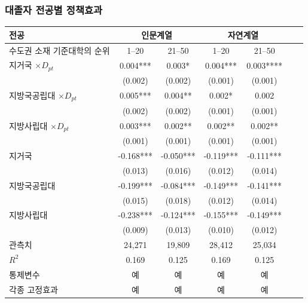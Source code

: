 \documentclass[aspectratio=169,xcolor=dvipsnames,handout]{beamer}
\begin{document}
\begin{frame}
    \frametitle{대졸자 전공별 정책효과}
    \begin{table}[ht]
        \tiny
        \centering
        \begin{tabular}{lcccccc}
        \toprule
        \textbf{전공} & \multicolumn{2}{c}{\textbf{인문계열}}& \multicolumn{2}{c}{\textbf{자연계열}} \\
        \midrule                                                                                  
        수도권 소재 기준대학의 순위    & 1--20     & 21--50    & 1--20     & 21--50    \\
        \midrule                                                          
        지거국 $\times D_{pt}$                         & 0.004***  & 0.003*    & 0.004***  & 0.003**** \\
                                                     & (0.002)   & (0.002)   & (0.001)   & (0.001)   \\
        지방국공립대 $\times D_{pt}$  & 0.005***  & 0.004**   & 0.002*    & 0.002     \\
                                                     & (0.002)   & (0.002)   & (0.001)   & (0.001)   \\
        지방사립대 $\times D_{pt}$ & 0.003***  & 0.002**   & 0.002**   & 0.002**   \\
                                                     & (0.001)   & (0.001)   & (0.001)   & (0.001)   \\
        지거국                                         & -0.168*** & -0.050*** & -0.119*** & -0.111*** \\
                                                     & (0.013)   & (0.016)   & (0.012)   & (0.014)   \\
        지방국공립대                  & -0.199*** & -0.084*** & -0.149*** & -0.141*** \\
                                                     & (0.015)   & (0.018)   & (0.012)   & (0.014)   \\
        지방사립대                 & -0.238*** & -0.124*** & -0.155*** & -0.149*** \\
                                                     & (0.009)   & (0.013)   & (0.010)   & (0.012)   \\
        \midrule                                                          
        관측치                                 & 24,271    & 19,809    & 28,412    & 25,034    \\
        $R^2$                                    & 0.169     & 0.125     & 0.169     & 0.125     \\
        통제변수                                     & 예       & 예       & 예       & 예       \\
        각종 고정효과                                          & 예       & 예       & 예       & 예       \\
        \bottomrule
        \end{tabular}
    \end{table}
\end{frame}
\end{document}
